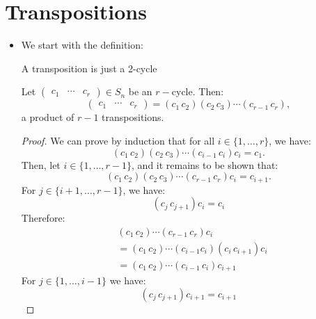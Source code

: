 \section{Transpositions}
\begin{itemize}
    \item We start with the definition:
    \begin{definition}
        A transposition is just a 2-cycle
    \end{definition}
    \begin{lemma}
        Let $\begin{pmatrix}
            c_1 & \cdots & c_r
        \end{pmatrix} \in S_n$ be an $r-$cycle. Then:
        \begin{equation}
            \begin{pmatrix}
                c_1 & \cdots & c_r
            \end{pmatrix} = (c_1\,c_2)(c_2\,c_3)\cdots (c_{r-1}\, c_r),
        \end{equation}
        a product of $r-1$ transpositions.
    \end{lemma}
    \begin{proof}
        We can prove by induction that for all $i\in \{1,\dots,r\}$, we have:
        \begin{equation}
            (c_1\,c_2)(c_2\,c_3)\cdots (c_{i-1}\, c_i)c_i = c_1.
        \end{equation}
        Then, let $i\in \{1,\dots,r-1\}$, and it remains to be shown that:
        \begin{equation}
            (c_1\,c_2)(c_2\,c_3)\cdots (c_{r-1}\, c_r)c_i = c_{i+1}.
        \end{equation}
        For $j\in\{i+1,\dots,r-1\}$, we have:
        \begin{equation}
            (c_j\, c_{j+1})c_i = c_i
        \end{equation}
        Therefore:
        \begin{align}
            & (c_1\,c_2)\cdots (c_{r-1}\, c_r)c_i \\ 
            &= (c_1\,c_2)\cdots (c_{i-1}c_i)(c_i\,c_{i+1})c_i \\ 
            &= (c_1\,c_2)\cdots (c_{i-1}\,c_i)c_{i+1}
        \end{align}
        For $j\in \{1,\dots,i-1\}$ we have:
        \begin{equation}
            (c_j\,c_{j+1})c_{i+1}=c_{i+1}
        \end{equation}

\end{proof}
\end{itemize}
